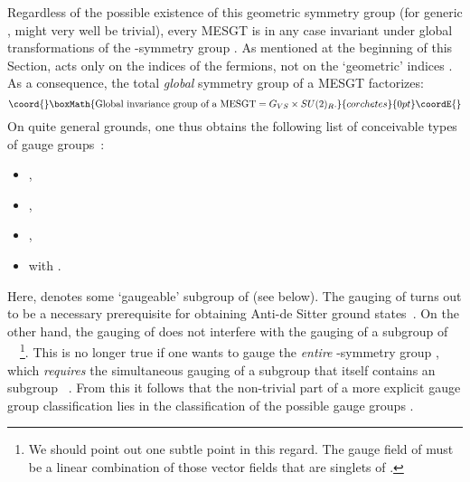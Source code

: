 \documentclass[a4paper,11pt]{article}
\providecommand{\ti}{\ensuremath{\tilde{I}}}
\providecommand{\tj}{\ensuremath{\tilde{J}}}
\providecommand{\tk}{\ensuremath{\tilde{K}}}
\begin{document}
Regardless of the possible existence of this geometric symmetry
group \coordHE{} (for generic \myHighlight{$C_{\ti\tj\tk}$}\coordHE{},  \coordHE{} might very
well be trivial), every MESGT is in any case invariant under
global transformations of the \coordHE{}-symmetry group \coordHE{}. As
mentioned at the beginning of this Section, \coordHE{}
acts only on the indices \coordHE{} of the fermions, not on the
`geometric' indices \myHighlight{$ (\ti, x)$}\coordHE{}. As a consequence, the total
\emph{global} symmetry group of a MESGT factorizes:
\begin{displaymath}\coord{}\boxMath{
\textrm{Global invariance group of a MESGT}= G_{VS}\times
SU(2)_{R}.
}{corchetes}{0pt}\coordE{}\end{displaymath}
On quite general grounds, one thus
obtains the following list of conceivable types of gauge
groups~\cite{GST2,GZ1,GZ3}:
\begin{itemize}
\item {}\coordHE{},
\item {}\coordHE{},
\item {}\coordHE{},
\item {}\coordHE{} with \coordHE{}.
\end{itemize}

Here, \coordHE{} denotes some `gaugeable' subgroup of \coordHE{} (see below). The
gauging of \coordHE{} turns out to be a necessary prerequisite for
obtaining Anti-de Sitter ground states~\cite{GST2,GZ1,GZ2}. On the other
hand, the gauging of \coordHE{} does not interfere with the gauging of a
subgroup \coordHE{} of \coordHE{}~\cite{GZ1}~\footnote{ We should point out one
subtle point in this regard. The gauge field of \coordHE{} must be a linear
combination of those vector fields that are singlets of \coordHE{}.}. This is no
longer true if one wants to gauge the \emph{entire} \coordHE{}-symmetry group
\coordHE{}, which \emph{requires} the simultaneous gauging of a subgroup
\coordHE{} that itself contains an \coordHE{} subgroup \coordHE{}~\cite{GZ3}. From this it follows that the non-trivial part of a more
explicit gauge group classification lies in the classification of the
possible gauge groups \coordHE{}. 
\end{document}
